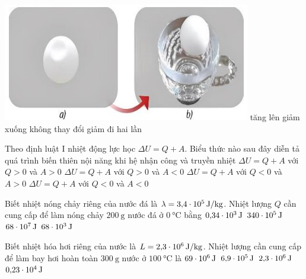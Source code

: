 \begin{ex}
	{\vspace{-0.5cm}\includegraphics[scale=0.5]{../figs/FINAL-SEM1-002-2}}
	\choice
	{tăng lên}
	{giảm xuống}
	{không thay đổi}
	{giảm đi hai lần}
	\loigiai{}
\end{ex}
\begin{ex}
	Theo định luật I nhiệt động lực học $\Delta U=Q+A$. Biểu thức nào sau đây diễn tả quá trình biến thiên nội năng khi hệ nhận công và truyền nhiệt
	\choice
	{$\Delta U=Q+A$ với $Q>0$ và $A>0$}
	{$\Delta U=Q+A$ với $Q>0$ và $A<0$}
	{$\Delta U=Q+A$ với $Q<0$ và $A>0$}
	{$\Delta U=Q+A$ với $Q<0$ và $A<0$}
	\loigiai{}
\end{ex}
\begin{ex}
	Biết nhiệt nóng chảy riêng của nước đá là $\lambda=\SI{3.4E5}{\joule/\kilogram}$. Nhiệt lượng $Q$ cần cung cấp để làm nóng chảy $\SI{200}{\gram}$ nước đá ở $\SI{0}{\celsius}$ bằng
	\choice
	{$\SI{0.34E3}{\joule}$}
	{$\SI{340E5}{\joule}$}
	{$\SI{68E7}{\joule}$}
	{$\SI{68E3}{\joule}$}
	\loigiai{}
\end{ex}
\begin{ex}
	Biết nhiệt hóa hơi riêng của nước là $L=\SI{2.3E6}{\joule/\kilogram}$. Nhiệt lượng cần cung cấp để làm bay hơi hoàn toàn $\SI{300}{\gram}$ nước ở $\SI{100}{\celsius}$ là 
	\choice
	{$\SI{69E6}{\joule}$}
	{$\SI{6.9E5}{\joule}$}
	{$\SI{2.3E6}{\joule}$}
	{$\SI{0.23E4}{\joule}$}
	\loigiai{}
\end{ex}
